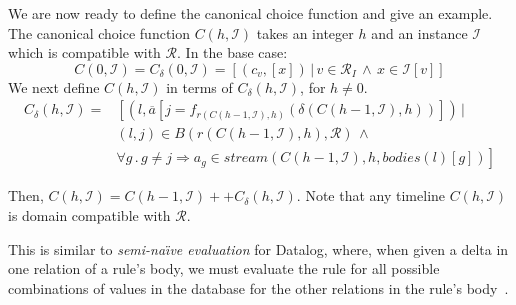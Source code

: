 We are now ready to define the canonical choice function and give an example.  The canonical choice function $C(h, \mathcal{I})$ takes an integer $h$ and an instance $\mathcal{I}$ which is compatible with $\mathcal{R}$.  In the base case:
$$C(0,\mathcal{I}) = C_\delta(0,\mathcal{I}) =  [(c_v,[x]) \, | \, v \in \mathcal{R}_I \, \land \, x \in \mathcal{I}[v]]$$
We next define $C(h,\mathcal{I})$ in terms of $C_\delta(h,\mathcal{I})$, for $h \neq 0$.
\begin{equation*}
\begin{split}
C_\delta(h,\mathcal{I}) = & \left[ (l, \overline{a}[j =  f_{r(C(h-1,\mathcal{I}),h)}(\delta(C(h-1,\mathcal{I}),h))]) \, | \right. \\
& \left. (l,j) \in B(r(C(h-1,\mathcal{I}),h), \mathcal{R}) \, \land \right. \\
& \left. \forall g \, . \, g \neq j \Rightarrow a_g \in stream(C(h-1,\mathcal{I}),h,bodies(l)[g]) \right]
\end{split}
\end{equation*}

Then, $ C(h,\mathcal{I}) = C(h-1,\mathcal{I}) ++ C_\delta(h,\mathcal{I})$.
Note that any timeline $C(h,\mathcal{I})$ is domain compatible with $\mathcal{R}$.

This is similar to {\em semi-na\"{\i}ve evaluation} for Datalog, where, when given a delta in one relation of a rule's body, we must evaluate the rule for all possible combinations of values in the database for the other relations in the rule's body~\cite{seminaive}.

